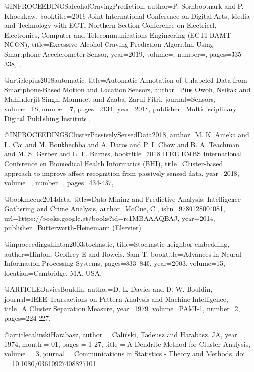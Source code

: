 @INPROCEEDINGS{alcoholCravingPrediction,  
  author={P. {Sornbootnark} and P. {Khoenkaw}},  
  booktitle={2019 Joint International Conference on Digital Arts, Media and Technology with ECTI Northern Section Conference on Electrical, Electronics, Computer and Telecommunications Engineering (ECTI DAMT-NCON)},  
  title={Excessive Alcohol Craving Prediction Algorithm Using Smartphone Accelerometer Sensor},   
  year={2019},  
  volume={},  
  number={},  
  pages={335-338},
},

@article{pius2018automatic,
  title={Automatic Annotation of Unlabeled Data from Smartphone-Based Motion and Location Sensors},
  author={Pius Owoh, Nsikak and Mahinderjit Singh, Manmeet and Zaaba, Zarul Fitri},
  journal={Sensors},
  volume={18},
  number={7},
  pages={2134},
  year={2018},
  publisher={Multidisciplinary Digital Publishing Institute}
},

@INPROCEEDINGS{ClusterPassivelySensedData2018,  
  author={M. K. {Ameko} and L. {Cai} and M. {Boukhechba} and A. {Daros} and P. I. {Chow} and B. A. {Teachman} and M. S. {Gerber} and L. E. {Barnes}},  
  booktitle={2018 IEEE EMBS International Conference on Biomedical   Health Informatics (BHI)},  
  title={Cluster-based approach to improve affect recognition from passively sensed data},   
  year={2018},  
  volume={},  
  number={},  
  pages={434-437},
}


@book{mccue2014data,
  title={Data Mining and Predictive Analysis: Intelligence Gathering and Crime Analysis},
  author={McCue, C.},
  isbn={9780128004081},
  url={https://books.google.at/books?id=re1MBAAAQBAJ},
  year={2014},
  publisher={Butterworth-Heinemann (Elsevier)}
}

@inproceedings{hinton2003stochastic,
  title={Stochastic neighbor embedding},
  author={Hinton, Geoffrey E and Roweis, Sam T},
  booktitle={Advances in Neural Information Processing Systems},
  pages={833--840},
  year={2003},
  volume={15},
  location={Cambridge, MA, USA},
}


@ARTICLE{DaviesBouldin,
  author={D. L. {Davies} and D. W. {Bouldin}},
  journal={IEEE Transactions on Pattern Analysis and Machine Intelligence}, 
  title={A Cluster Separation Measure}, 
  year={1979},
  volume={PAMI-1},
  number={2},
  pages={224-227},
}


@article{calinskiHarabasz,
  author = {Caliński, Tadeusz and Harabasz, JA},
  year = {1974},
  month = {01},
  pages = {1-27},
  title = {A Dendrite Method for Cluster Analysis},
  volume = {3},
  journal = {Communications in Statistics - Theory and Methods},
  doi = {10.1080/03610927408827101}
}


